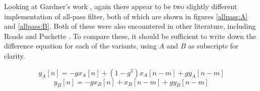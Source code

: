 \documentclass[12pt]{report}
\begin{document}
  Looking at Gardner's work \cite{gardner1998algorithms, gardner1992virtual},
  again there appear to be two slightly different implementation of all-pass
  filter, both of which are shown in figures \ref{allpass:A} and \ref{allpass:B}.
  Both of these were also encountered in other literature, including Roads
  \cite{roads1996computer} and Puckette \cite{puckette2007theory}. To compare
  these, it should be sufficient to write down the difference equation for
  each of the variants, using $A$ and $B$ as subscripts for clarity.

  \begin{equation}\label{eq:ayAn}
    y_A[n] = -gx_A[n] +(1-g^2)x_A[n-m] +gy_A[n-m]
  \end{equation}
  \begin{equation}\label{eq:ayBn}
    y_B[n] = -gx_B[n] +x_B[n-m] +gy_B[n-m]
  \end{equation}
\end{document}
